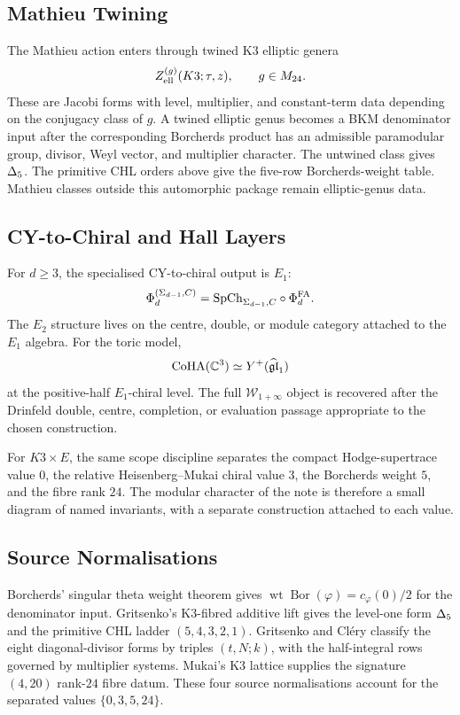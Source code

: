 \subsection*{Mathieu Twining}

The Mathieu action enters through twined K3 elliptic genera
\[
  Z_{\mathrm{ell}}^{(g)}(K3;\tau,z),
  \qquad g\in M_{24}.
\]
These are Jacobi forms with level, multiplier, and constant-term data
depending on the conjugacy class of $g$.  A twined elliptic genus becomes
a BKM denominator input after the corresponding Borcherds product has
an admissible paramodular group, divisor, Weyl vector, and multiplier
character.  The untwined class gives $\Delta_5$.  The primitive CHL
orders above give the five-row Borcherds-weight table.  Mathieu classes
outside this automorphic package remain elliptic-genus data.

\subsection*{CY-to-Chiral and Hall Layers}

For $d\geq 3$, the specialised CY-to-chiral output is $E_1$:
\[
  \Phi_d^{(\Sigma_{d-1},C)}
  =
  \mathrm{SpCh}_{\Sigma_{d-1},C}\circ \Phi^{\mathrm{FA}}_d.
\]
The $E_2$ structure lives on the centre, double, or module category
attached to the $E_1$ algebra.  For the toric model,
\[
  \mathrm{CoHA}(\mathbb C^3)\simeq Y^+(\widehat{\mathfrak{gl}}_1)
\]
at the positive-half $E_1$-chiral level.  The full
$\mathcal W_{1+\infty}$ object is recovered after the Drinfeld
double, centre, completion, or evaluation passage appropriate to the
chosen construction.

For $K3\times E$, the same scope discipline separates the compact
Hodge-supertrace value $0$, the relative Heisenberg--Mukai chiral value
$3$, the Borcherds weight $5$, and the fibre rank $24$.  The modular
character of the note is therefore a small diagram of named invariants,
with a separate construction attached to each value.

\subsection*{Source Normalisations}

Borcherds' singular theta weight theorem gives
$\operatorname{wt}\operatorname{Bor}(\varphi)=c_\varphi(0)/2$ for the
denominator input.  Gritsenko's K3-fibred additive lift gives the
level-one form $\Delta_5$ and the primitive CHL ladder
$(5,4,3,2,1)$.  Gritsenko and Cl\'ery classify the eight diagonal-divisor
forms by triples $(t,N;k)$, with the half-integral rows governed by
multiplier systems.  Mukai's K3 lattice supplies the signature $(4,20)$
rank-$24$ fibre datum.  These four source normalisations account for
the separated values $\{0,3,5,24\}$.
